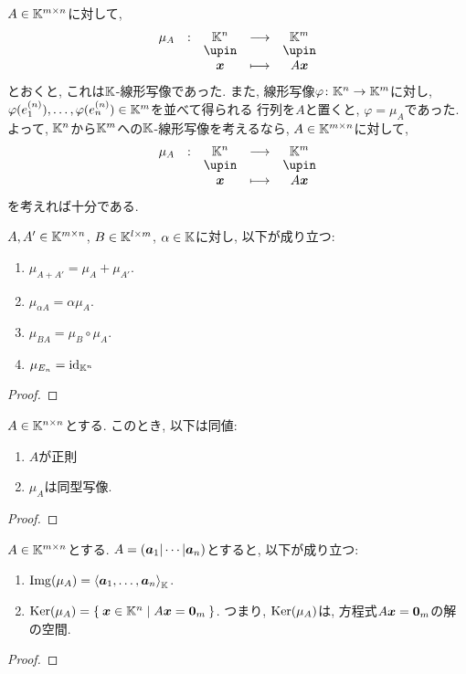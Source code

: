 $A\in\mathbb{K}^{m\times n}$に対して,
\begin{align*}
  \shazo{\mu_A}{\KK^n}{\KK^m}
        {\xx}
        {A\xx}
\end{align*}
とおくと, これは$\mathbb{K}$-線形写像であった.
また, 線形写像$\varphi\colon \mathbb{K}^n\to \mathbb{K}^m$に対し,
$\varphi(e^{(n)}_1),\ldots,\varphi(e^{(n)}_n)\in\mathbb{K}^m$を並べて得られる
行列を$A$と置くと,
$\varphi=\mu_A$であった.
よって, 
$\mathbb{K}^n$から$\mathbb{K}^m$への$\mathbb{K}$-線形写像を考えるなら,
$A\in\mathbb{K}^{m\times n}$に対して,
\begin{align*}
  \shazo{\mu_A}{\KK^n}{\KK^m}
        {\xx}
        {A\xx}
\end{align*}
を考えれば十分である.

\begin{prop}
\label{prop:hom:mat:mor}
  $A,A'\in \mathbb{K}^{m\times n}$,
  $B\in\mathbb{K}^{l\times m}$,
  $\alpha \in\mathbb{K}$に対し, 以下が成り立つ:
  \begin{enumerate}
  \item $\mu_{A+A'}=\mu_A+\mu_{A'}$.
  \item $\mu_{\alpha A}=\alpha\mu_A$.
  \item $\mu_{BA}=\mu_B\circ\mu_{A}$.
  \item $\mu_{E_n}=\operatorname{id}_{\mathbb{K}^n}$
  \end{enumerate}
\end{prop}
\begin{proof}\end{proof}

\begin{cor}
  $A\in \mathbb{K}^{n\times n}$とする.
  このとき,
  以下は同値:
  \begin{enumerate}
  \item $A$が正則
  \item $\mu_A$は同型写像.
  \end{enumerate}
\end{cor}
\begin{proof}\end{proof}


\begin{prop}
  $A\in\mathbb{K}^{m\times n}$とする.
  $A=(\boldsymbol{a}_1|\cdots|\boldsymbol{a}_n)$とすると,
  以下が成り立つ:
  \begin{enumerate}
  \item $\operatorname{Img}(\mu_A)=\Braket{\boldsymbol{a}_1,\ldots,\boldsymbol{a}_n}_{\mathbb{K}}$.
  \item $\operatorname{Ker}(\mu_A)=\Set{\boldsymbol{x}\in\mathbb{K}^n|A\boldsymbol{x}=\boldsymbol{0}_m}$. つまり, $\operatorname{Ker}(\mu_A)$は,
    方程式$A\boldsymbol{x}=\boldsymbol{0}_m$の解の空間.
  \end{enumerate}
\end{prop}
\begin{proof}\end{proof}

